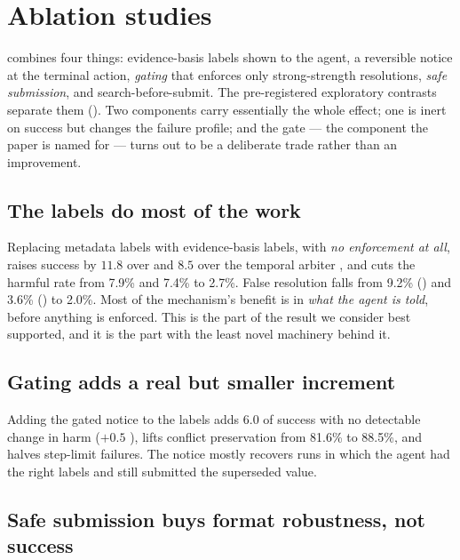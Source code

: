 \section{Ablation studies}
\label{sec:ablations}

 combines four things: evidence-basis labels shown to the agent, a reversible notice at the terminal
action, \emph{gating} that enforces only strong-strength resolutions, \emph{safe submission}, and
search-before-submit. The pre-registered exploratory contrasts separate them (). Two
components carry essentially the whole effect; one is inert on success but changes the failure profile; and the
gate --- the component the paper is named for --- turns out to be a deliberate trade rather than an improvement.



\subsection{The labels do most of the work}

Replacing metadata labels with evidence-basis labels, with \emph{no enforcement at all}, raises success by
$11.8$\pp{} over  and $8.5$\pp{} over the temporal arbiter , and cuts the harmful rate from 7.9\%
and 7.4\% to 2.7\%. False resolution falls from 9.2\% () and 3.6\% () to 2.0\%. Most of the
mechanism's benefit is in \emph{what the agent is told}, before anything is enforced. This is the part of the
result we consider best supported, and it is the part with the least novel machinery behind it.

\subsection{Gating adds a real but smaller increment}

Adding the gated notice to the labels adds $6.0$\pp{}  of success with no detectable change in harm
($+0.5$\pp{} ), lifts conflict preservation from 81.6\% to 88.5\%, and halves step-limit failures.
The notice mostly recovers runs in which the agent had the right labels and still submitted the superseded value.

\subsection{Safe submission buys format robustness, not success}

